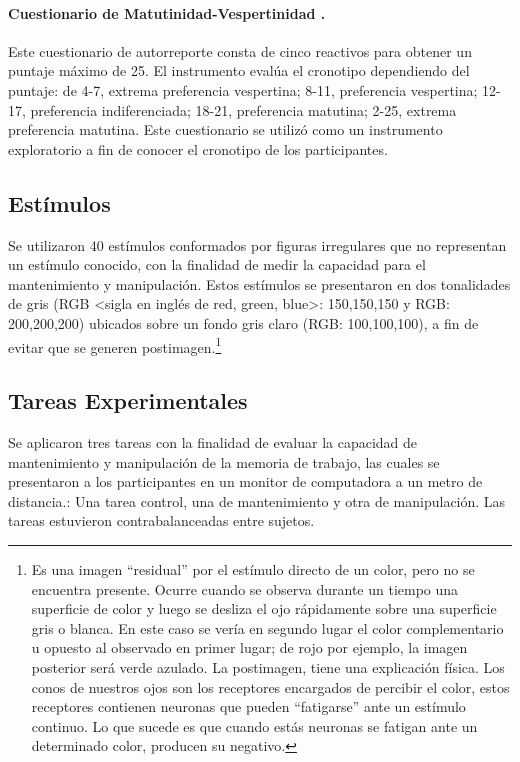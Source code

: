 \documentclass[12pt,letterpaper,final]{article}
\let\cite\cite %
\begin{document}
\paragraph[Cuestionario de Matutinidad-Vespertinidad%
]{Cuestionario de Matutinidad-Vespertinidad \cite{Horne1976}.}
Este cuestionario de autorreporte consta de cinco reactivos para obtener un puntaje máximo de 25. El instrumento evalúa el cronotipo dependiendo del puntaje: de 4-7, extrema preferencia vespertina; 8-11, preferencia vespertina; 12-17, preferencia indiferenciada; 18-21, preferencia matutina; 2-25, extrema preferencia matutina.
Este cuestionario se utilizó como un instrumento exploratorio a fin de conocer el cronotipo de los participantes.


\subsection{Estímulos}
Se utilizaron 40 estímulos conformados por figuras irregulares que no representan un estímulo conocido, con la finalidad de medir la capacidad para el mantenimiento y manipulación. %
Estos estímulos se presentaron en dos tonalidades de gris (RGB \textless sigla en inglés de red, green, blue\textgreater{}: 150,150,150 y RGB: 200,200,200) ubicados sobre un fondo gris claro (RGB: 100,100,100), a fin de  evitar que se generen postimagen.\footnote{Es una imagen ``residual'' por el estímulo directo de un color, pero no se encuentra presente. Ocurre cuando se observa durante un tiempo una superficie de color y luego se desliza el ojo rápidamente sobre una superficie gris o blanca. En este caso se vería en segundo lugar el color complementario u opuesto al observado en primer lugar; de rojo por ejemplo, la imagen posterior será verde azulado. La postimagen, tiene una explicación física. Los conos de nuestros ojos son los receptores encargados de percibir el color, estos receptores contienen neuronas que pueden ``fatigarse'' ante un estímulo continuo. Lo que sucede es que cuando estás neuronas se fatigan ante un determinado color, producen su negativo.}

\subsection{Tareas Experimentales}

Se aplicaron tres tareas con la finalidad de evaluar la capacidad de mantenimiento y manipulación de la memoria de trabajo, las cuales se presentaron a los participantes en un monitor de computadora a un metro de distancia.: Una tarea control, una de mantenimiento y otra de manipulación. Las tareas estuvieron contrabalanceadas entre sujetos.
\end{document}
